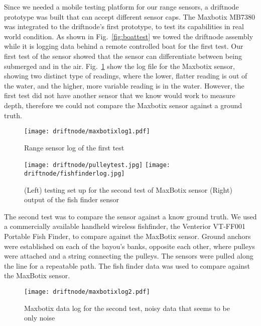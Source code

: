 Since we needed a mobile testing platform for our range sensors, a driftnode prototype was built that can accept different sensor caps.
The Maxbotix MB7380 was integrated to the driftnode's first prototype, to test its capabilities in real world condition.
As shown in Fig.~\ref{fig:boattest} we towed the driftnode assembly while it is logging data behind a remote controlled boat for the first test.
Our first test of the sensor showed that the sensor can differentiate between being submerged and in the air.
Fig.~\ref{fig:boattestlog} show the log file for the Maxbotix sensor, showing two distinct type of readings, where the lower, flatter reading is out of the water, and the higher, more variable reading is in the water.
However, the first test did not have another sensor that we know would work to measure depth, therefore we could not compare the Maxbotix sensor against a ground truth.

\begin{figure}[h]
	\begin{center}
	\texttt{[image: driftnode/maxbotixlog1.pdf]}
	\caption[MaxBotix first test]{
		Range sensor log of the first test
	} \label{fig:boattestlog}
	\end{center}
	\vspace{-1em}
\end{figure}

\begin{figure}[h]
	\begin{center}
	\texttt{[image: driftnode/pulleytest.jpg]}
	\texttt{[image: driftnode/fishfinderlog.jpg]}
	\caption[Maxbotix pulley test]{
		(Left) testing set up for the second test of MaxBotix sensor
		(Right) output of the fish finder sensor
	} \label{fig:pulleytestsetup}
	\end{center}
	\vspace{-1em}
\end{figure}

The second test was to compare the sensor against a know ground truth.
We used a commercially available handheld wireless fishfinder, the Venterior VT-FF001 Portable Fish Finder, to compare against the MaxBotix sensor.
Ground anchors were established on each of the bayou's banks, opposite each other, where pulleys were attached and a string connecting the pulleys.
The sensors were pulled along the line for a repeatable path.
The fish finder data was used to compare against the MaxBotix sensor.
\begin{figure}[h]
	\begin{center}
	\texttt{[image: driftnode/maxbotixlog2.pdf]}
	\caption[Maxbotix pulley test log]{
		Maxbotix data log for the second test, noisy data that seems to be only noise
	} \label{fig:pulleylog}
	\end{center}
	\vspace{-1em}
\end{figure}

